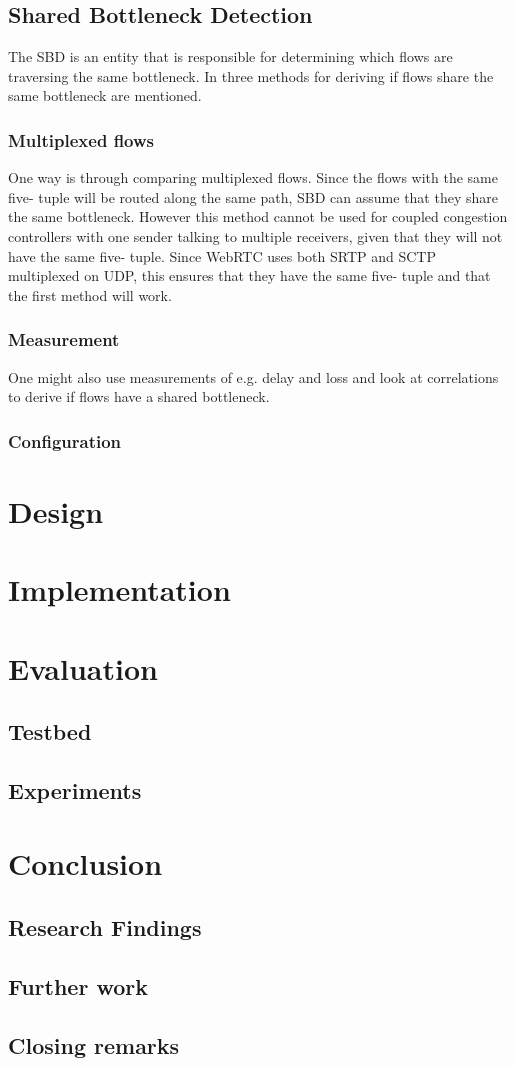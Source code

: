 \documentclass[UKenglish]{ifimaster}
\begin{document}
\section{Shared Bottleneck Detection}
The SBD is an entity that is responsible for determining which flows are traversing the same bottleneck. 
In \cite{rfc8699} three methods for deriving if flows share the same bottleneck are mentioned.

\subsection{Multiplexed flows}
One way is through comparing multiplexed flows. 
Since the flows with the same five- tuple will be routed along the same path, SBD can assume that they share the same bottleneck. 
However this method cannot be used for coupled congestion controllers with one sender talking to multiple receivers, given that they will not have the same five- tuple. 
Since WebRTC uses both SRTP and SCTP multiplexed on UDP, this ensures that they have the same five- tuple and that the first method will work. 
\subsection{Measurement}
One might also use measurements of e.g. delay and loss and look at correlations to derive if flows have a shared bottleneck.
\subsection{Configuration}


\chapter{Design}

\chapter{Implementation}                 


\chapter{Evaluation}
\section{Testbed}
\section{Experiments}

\chapter{Conclusion}                    
\section{Research Findings}
\section{Further work}
\section{Closing remarks}

\backmatter{}
\printbibliography
\end{document}
